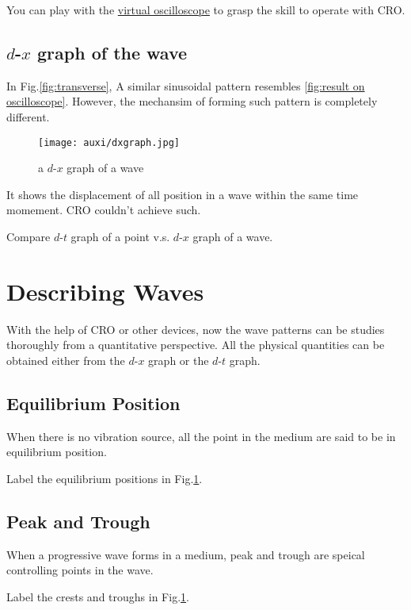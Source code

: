 \documentclass[a4paper]{tufte-handout}
\newenvironment{TaskBox} %
{\begin{tcolorbox}[breakable,colback=b1!30,colframe=b1,title=Task]} {\end{tcolorbox}}
\begin{document}
You can play with the \href{https://physics-zone.com/sim/virtual-oscilloscope/}{virtual oscilloscope} to grasp the skill to operate with CRO.

\subsection{$d$-$x$ graph of the wave}
In Fig.\ref{fig:transverse}, A similar sinusoidal pattern resembles \ref{fig:result on oscilloscope}. However, the mechansim of forming such pattern is completely different. 
\begin{figure}[h]
\centering
\texttt{[image: auxi/dxgraph.jpg]}
\caption{a $d$-$x$ graph of a wave}
\label{fig:dxgraph}
\end{figure}
It shows the displacement of all position in a wave within the same time momement. CRO couldn't achieve such. 
\begin{TaskBox}
Compare $d$-$t$ graph of a point v.s. $d$-$x$ graph of a wave.
\vspace{1in}
\end{TaskBox}


\section{Describing Waves}
With the help of CRO or other devices, now the wave patterns can be studies thoroughly from a quantitative perspective. All the physical quantities can be obtained either from the $d$-$x$ graph or the $d$-$t$ graph.

\subsection{Equilibrium Position}
When there is no vibration source, all the point in the medium are said to be in equilibrium position. 
\begin{TaskBox}
Label the equilibrium positions in Fig.\ref{fig:dxgraph}.
\end{TaskBox}

\subsection{Peak and Trough}
When a progressive wave forms in a medium, peak and trough are speical controlling points in the wave.
\begin{TaskBox}
Label the crests and troughs in Fig.\ref{fig:dxgraph}.
\end{TaskBox}
\end{document}
